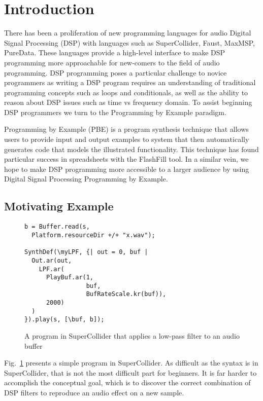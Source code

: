 
\section{Introduction}

There has been a proliferation of new programming languages for audio Digital Signal Processing (DSP) with languages such as SuperCollider, Faust, MaxMSP, PureData.
These languages provide a high-level interface to make DSP programming more approachable for new-comers to the field of audio programming.
DSP programming poses a particular challenge to novice programmers as writing a DSP program requires an understanding of traditional programming concepts such as loops and conditionals, as well as the ability to reason about DSP issues such as time vs frequency domain.
To assist beginning DSP programmers we turn to the Programming by Example paradigm.

Programming by Example (PBE) is a program synthesis technique that allows users to provide input and output examples to system that then automatically generates code that models the illustrated functionality.
This technique has found particular success in spreadsheets with the FlashFill tool.
In a similar vein, we hope to make DSP programming more accessible to a larger audience by using Digital Signal Processing Programming by Example.


\subsection{Motivating Example}


\begin{figure}
\begin{lstlisting}
b = Buffer.read(s, 
  Platform.resourceDir +/+ "x.wav");

SynthDef(\myLPF, {| out = 0, buf |
  Out.ar(out,
    LPF.ar(
      PlayBuf.ar(1, 
                 buf, 
                 BufRateScale.kr(buf)),
      2000)
  )
}).play(s, [\buf, b]);
\end{lstlisting}
\caption{A program in SuperCollider that applies a low-pass filter to an audio buffer}
\label{fig:sc_code}
\end{figure}

Fig.~\ref{fig:sc_code} presents a simple program in SuperCollider.
As difficult as the syntax is in SuperCollider, that is not the most difficult part for beginners.
It is far harder to accomplish the conceptual goal, which is to discover the correct combination of DSP filters to reproduce an audio effect on a new sample.


